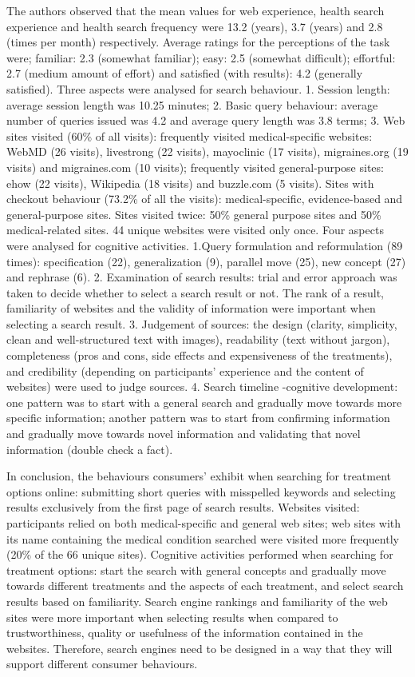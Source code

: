 \documentclass[]{article}
\begin{document}
The authors observed that the mean values for web experience, health search experience and health search frequency were 13.2 (years), 3.7 (years) and 2.8 (times per month) respectively. Average ratings for the perceptions of the task were; familiar: 2.3 (somewhat familiar); easy: 2.5 (somewhat difficult); effortful: 2.7 (medium amount of effort) and satisfied (with results): 4.2 (generally satisfied). Three aspects were analysed for search behaviour. 1. Session length: average session length was 10.25 minutes; 2. Basic query behaviour: average number of queries issued was 4.2 and average query length was 3.8 terms; 3. Web sites visited (60\% of all visits): frequently visited medical-specific websites: WebMD (26 visits), livestrong (22 visits), mayoclinic (17 visits), migraines.org (19 visits) and migraines.com (10 visits); frequently visited general-purpose sites:  ehow (22 visits), Wikipedia (18 visits) and buzzle.com (5 visits). Sites with checkout behaviour (73.2\% of all the visits): medical-specific, evidence-based and general-purpose sites. Sites visited twice: 50\% general purpose sites and 50\% medical-related sites. 44 unique websites were visited only once. Four aspects were analysed for cognitive activities. 1.Query formulation and reformulation (89 times): specification (22), generalization (9), parallel move (25), new concept (27) and rephrase (6). 2. Examination of search results: trial and error approach was taken to decide whether to select a search result or not. The rank of a result, familiarity of websites and the validity of information were important when selecting a search result. 3. Judgement of sources: the design (clarity, simplicity, clean and well-structured text with images), readability (text without jargon), completeness (pros and cons, side effects and expensiveness of the treatments), and credibility (depending on participants' experience and the content of websites) were used to judge sources. 4. Search timeline -cognitive development: one pattern was to start with a general search and gradually move towards more specific information; another pattern was to start from confirming information and gradually move towards novel information and validating that novel information (double check a fact).

In conclusion, the behaviours consumers' exhibit when searching for treatment options online:  submitting short queries with misspelled keywords and selecting results exclusively from the first page of search results. Websites visited: participants relied on both medical-specific and general web sites; web sites with its name containing the medical condition searched were visited more frequently (20\% of the 66 unique sites). Cognitive activities performed when searching for treatment options: start the search with general concepts and gradually move towards different treatments and the aspects of each treatment, and select search results based on familiarity. Search engine rankings and familiarity of the web sites were more important when selecting results when compared to trustworthiness, quality or usefulness of the information contained in the websites. Therefore, search engines need to be designed in a way that they will support different consumer behaviours.  
\end{document}
